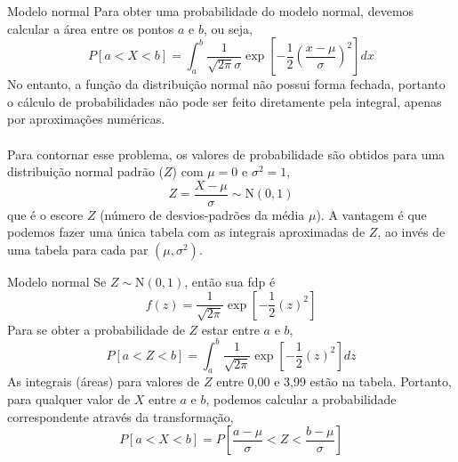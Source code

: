 \documentclass[10pt]{beamer}\usepackage[]{graphicx}\usepackage[]{color}
\providecommand{\N}{\text{N}}
\theoremstyle{definition}
\begin{document}
\begin{frame}[fragile]{Modelo normal}
  Para obter uma probabilidade do modelo normal, devemos calcular a área
  entre os pontos $a$ e $b$, ou seja,
  \begin{equation*}
    P[a < X < b] = \int_a^b \frac{1}{\sqrt{2\pi}\sigma} \exp\left[-\frac{1}{2}
      \left( \frac{x - \mu}{\sigma}\right)^2\right] dx
  \end{equation*}
  No entanto, a função da distribuição normal não possui forma
  fechada, portanto o cálculo de probabilidades não pode ser feito
  diretamente pela integral, apenas por aproximações numéricas. \\~\\
  Para contornar esse problema, os valores de probabilidade são
  obtidos para uma distribuição normal padrão ($Z$) com $\mu = 0$ e
  $\sigma^2 = 1$,
  \begin{equation*}
    Z = \frac{X - \mu}{\sigma} \sim \text{N}(0,1)
  \end{equation*}
  que é o escore $Z$ (número de desvios-padrões da média $\mu$). A
  vantagem é que podemos fazer uma única tabela com as integrais
  aproximadas de $Z$, ao invés de uma tabela para cada par
  $(\mu,\sigma^2)$.
\end{frame}

\begin{frame}[fragile]{Modelo normal}
  Se $Z \sim \N(0,1)$, então sua fdp é
  \begin{equation*}
    f(z) = \frac{1}{\sqrt{2\pi}} \exp\left[-\frac{1}{2} (z)^2 \right]
  \end{equation*}
  Para se obter a probabilidade de $Z$ estar entre $a$ e $b$,
  \begin{equation*}
    P[a < Z < b] = \int_a^b \frac{1}{\sqrt{2\pi}} \exp\left[-\frac{1}{2}
      (z)^2 \right] dz
  \end{equation*}
  As integrais (áreas) para valores de $Z$ entre 0,00 e 3,99 estão na
  tabela. Portanto, para qualquer valor de $X$ entre $a$ e $b$, podemos
  calcular a probabilidade correspondente através da transformação,
  \begin{equation*}
    P[a < X < b] = P\left[\frac{a - \mu}{\sigma} < Z < \frac{b
        - \mu}{\sigma}\right]
  \end{equation*}
\end{frame}
\end{document}
